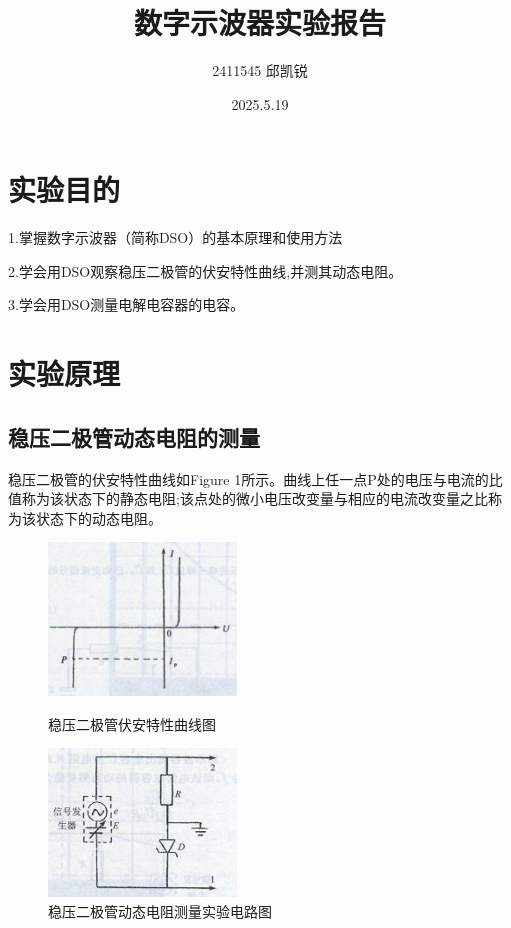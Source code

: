 \documentclass{article}
\title{数字示波器实验报告}
\author{2411545 邱凯锐}
\date{2025.5.19}
\begin{document}
\maketitle
\section{实验目的}
1.掌握数字示波器（简称DSO）的基本原理和使用方法

2.学会用DSO观察稳压二极管的伏安特性曲线,并测其动态电阻。

3.学会用DSO测量电解电容器的电容。

\section{实验原理}
\subsection{稳压二极管动态电阻的测量}
稳压二极管的伏安特性曲线如Figure 1所示。曲线上任一点P处的电压与电流的比值称为该状态下的静态电阻;该点处的微小电压改变量与相应的电流改变量之比称为该状态下的动态电阻。

\begin{figure}[!ht]
    \centering
    \begin{minipage}{0.45\textwidth} %
        \centering
        \includegraphics[width=5cm]{1.png} %
        \caption{稳压二极管伏安特性曲线图}
    \end{minipage}\hfill
    \begin{minipage}{0.45\textwidth}
        \centering
        \includegraphics[width=5cm]{2.png} %
        \caption{稳压二极管动态电阻测量实验电路图}
    \end{minipage}
\end{figure}
\end{document}
